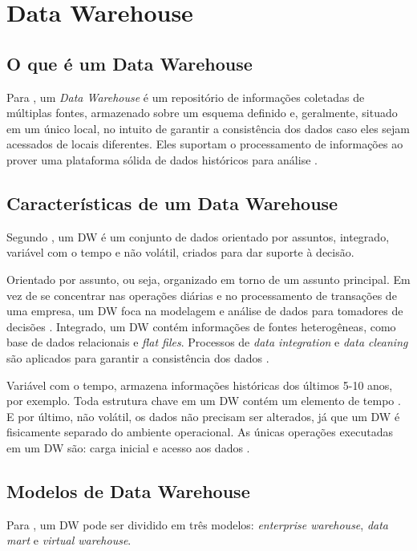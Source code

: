 \section{ Data Warehouse}
\subsection{O que é um Data Warehouse}
Para , um \textit{Data Warehouse} é um repositório de informações coletadas de múltiplas fontes, armazenado sobre um esquema definido e, geralmente, situado em um único local, no intuito de garantir a consistência dos dados caso eles sejam acessados de locais diferentes. Eles suportam o processamento de informações ao prover uma plataforma sólida de dados históricos para análise \citep{jmj}.

\subsection{Características de um Data Warehouse}
Segundo , um DW é um conjunto de dados orientado por assuntos, integrado, variável com o tempo e não volátil, criados para dar suporte à decisão.

Orientado por assunto, ou seja, organizado em torno de um assunto principal. Em vez de se concentrar nas operações diárias e no processamento de transações de uma empresa, um DW foca na modelagem e análise de dados para tomadores de decisões \citep{jmj}.
Integrado, um DW contém informações de fontes heterogêneas, como base de dados relacionais e \textit{flat files}. Processos de \textit{data integration} e \textit{data cleaning} são aplicados para garantir a consistência dos dados \citep{jmj}.

Variável com o tempo, armazena informações históricas dos últimos 5-10 anos, por exemplo. Toda estrutura chave em um DW contém um elemento de tempo \citep{jmj}.
E por último, não volátil, os dados não precisam ser alterados, já que um DW é fisicamente separado do ambiente operacional. As únicas operações executadas em um DW são: carga inicial e acesso aos dados \citep{jmj}.

\subsection{Modelos de Data Warehouse}
Para , um DW pode ser dividido em três modelos: \textit{enterprise warehouse}, \textit{data mart} e \textit{virtual warehouse}.

